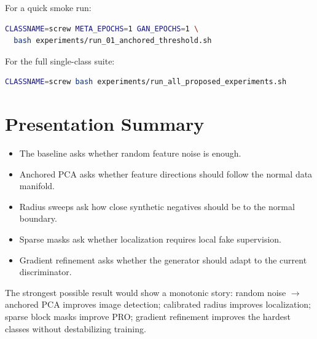 \documentclass[11pt]{article}
\begin{document}
\noindent
For a quick smoke run:

\begin{lstlisting}[language=bash]
CLASSNAME=screw META_EPOCHS=1 GAN_EPOCHS=1 \
  bash experiments/run_01_anchored_threshold.sh
\end{lstlisting}

\noindent
For the full single-class suite:

\begin{lstlisting}[language=bash]
CLASSNAME=screw bash experiments/run_all_proposed_experiments.sh
\end{lstlisting}

\section{Presentation Summary}

\begin{itemize}[leftmargin=*]
  \item The baseline asks whether random feature noise is enough.
  \item Anchored PCA asks whether feature directions should follow the normal
  data manifold.
  \item Radius sweeps ask how close synthetic negatives should be to the normal
  boundary.
  \item Sparse masks ask whether localization requires local fake supervision.
  \item Gradient refinement asks whether the generator should adapt to the
  current discriminator.
\end{itemize}

\noindent
The strongest possible result would show a monotonic story: random noise
$\rightarrow$ anchored PCA improves image detection; calibrated radius improves
localization; sparse block masks improve PRO; gradient refinement improves the
hardest classes without destabilizing training.
\end{document}
